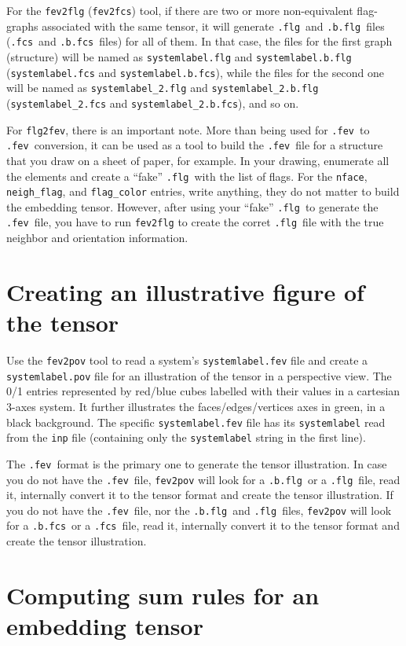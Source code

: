 \documentclass{scrreprt}
\newcommand{\fev}{\texttt{.fev}}
\newcommand{\fcs}{\texttt{.fcs}}
\newcommand{\flg}{\texttt{.flg}}
\newcommand{\fcsb}{\texttt{.b.fcs}}
\newcommand{\flgb}{\texttt{.b.flg}}
\begin{document}
For the \verb-fev2flg- (\verb-fev2fcs-) tool, if there are two or more non-equivalent flag-graphs associated with the same tensor, it will generate \flg~and \flgb~files (\fcs~and \fcsb~files) for all of them. In that case, the files for the first graph (structure) will be named as \verb-systemlabel.flg- and \verb-systemlabel.b.flg- (\verb-systemlabel.fcs- and \verb-systemlabel.b.fcs-), while the files for the second one will be named as \verb-systemlabel_2.flg- and \verb-systemlabel_2.b.flg- (\verb-systemlabel_2.fcs- and \verb-systemlabel_2.b.fcs-), and so on.

For \verb-flg2fev-, there is an important note. More than being used for \fev~to \fev~conversion, it can be used as a tool to build the \fev~file for a structure that you draw on a sheet of paper, for example. In your drawing, enumerate all the elements and create a ``fake'' \flg~with the list of flags. For the \verb-nface-, \verb-neigh_flag-, and \verb-flag_color- entries, write anything, they do not matter to build the embedding tensor. However, after using your ``fake'' \flg~to generate the \fev~file, you have to run \verb-fev2flg- to create the corret \flg~file with the true neighbor and orientation information.


\section{Creating an illustrative figure of the tensor}

Use the \verb-fev2pov- tool to read a system's \verb-systemlabel.fev- file and create a \verb-systemlabel.pov- file for an illustration of the tensor in a perspective view. The 0/1 entries represented by red/blue cubes labelled with their values in a cartesian 3-axes system. It further illustrates the faces/edges/vertices axes in green, in a black background. The specific \verb-systemlabel.fev- file has its \verb-systemlabel- read from the \verb-inp- file (containing only the \verb-systemlabel- string in the first line).

The \fev~format is the primary one to generate the tensor illustration. In case you do not have the \fev~file, \verb-fev2pov- will look for a \flgb~or a \flg~file, read it, internally convert it to the tensor format and create the tensor illustration. If you do not have the \fev~file, nor the \flgb~and \flg~files, \verb-fev2pov- will look for a \fcsb~or a \fcs~file, read it, internally convert it to the tensor format and create the tensor illustration.


\section{Computing sum rules for an embedding tensor}
\end{document}
